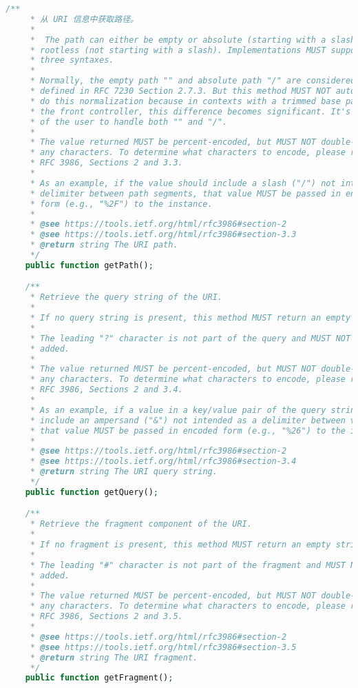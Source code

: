 \begin{lstlisting}[language=PHP]
    /**
     * 从 URI 信息中获取路径。
     *
     *  The path can either be empty or absolute (starting with a slash) or
     * rootless (not starting with a slash). Implementations MUST support all
     * three syntaxes.
     *
     * Normally, the empty path "" and absolute path "/" are considered equal as
     * defined in RFC 7230 Section 2.7.3. But this method MUST NOT automatically
     * do this normalization because in contexts with a trimmed base path, e.g.
     * the front controller, this difference becomes significant. It's the task
     * of the user to handle both "" and "/".
     *
     * The value returned MUST be percent-encoded, but MUST NOT double-encode
     * any characters. To determine what characters to encode, please refer to
     * RFC 3986, Sections 2 and 3.3.
     *
     * As an example, if the value should include a slash ("/") not intended as
     * delimiter between path segments, that value MUST be passed in encoded
     * form (e.g., "%2F") to the instance.
     *
     * @see https://tools.ietf.org/html/rfc3986#section-2
     * @see https://tools.ietf.org/html/rfc3986#section-3.3
     * @return string The URI path.
     */
    public function getPath();

    /**
     * Retrieve the query string of the URI.
     *
     * If no query string is present, this method MUST return an empty string.
     *
     * The leading "?" character is not part of the query and MUST NOT be
     * added.
     *
     * The value returned MUST be percent-encoded, but MUST NOT double-encode
     * any characters. To determine what characters to encode, please refer to
     * RFC 3986, Sections 2 and 3.4.
     *
     * As an example, if a value in a key/value pair of the query string should
     * include an ampersand ("&") not intended as a delimiter between values,
     * that value MUST be passed in encoded form (e.g., "%26") to the instance.
     *
     * @see https://tools.ietf.org/html/rfc3986#section-2
     * @see https://tools.ietf.org/html/rfc3986#section-3.4
     * @return string The URI query string.
     */
    public function getQuery();

    /**
     * Retrieve the fragment component of the URI.
     *
     * If no fragment is present, this method MUST return an empty string.
     *
     * The leading "#" character is not part of the fragment and MUST NOT be
     * added.
     *
     * The value returned MUST be percent-encoded, but MUST NOT double-encode
     * any characters. To determine what characters to encode, please refer to
     * RFC 3986, Sections 2 and 3.5.
     *
     * @see https://tools.ietf.org/html/rfc3986#section-2
     * @see https://tools.ietf.org/html/rfc3986#section-3.5
     * @return string The URI fragment.
     */
    public function getFragment();


\end{lstlisting}

